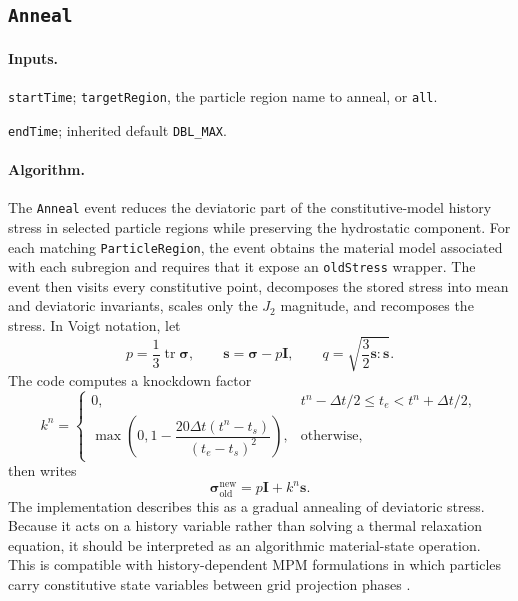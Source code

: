 \subsection{\texttt{Anneal}}
\label{subsec:event-anneal}

\paragraph{Inputs.}
\begin{description}[leftmargin=*,style=nextline]
\item[\textbf{Required.}] \texttt{startTime}; \texttt{targetRegion}, the particle region name to anneal, or \texttt{all}.
\item[\textbf{Optional.}] \texttt{endTime}; inherited default \texttt{DBL\_MAX}.
\end{description}

\paragraph{Algorithm.}
The \texttt{Anneal} event reduces the deviatoric part of the constitutive-model history stress in selected particle regions while preserving the hydrostatic component.  For each matching \texttt{ParticleRegion}, the event obtains the material model associated with each subregion and requires that it expose an \texttt{oldStress} wrapper.  The event then visits every constitutive point, decomposes the stored stress into mean and deviatoric invariants, scales only the $J_2$ magnitude, and recomposes the stress.  In Voigt notation, let
\begin{equation}
  p = \frac{1}{3}\operatorname{tr}\boldsymbol{\sigma},\qquad
  \mathbf{s}=\boldsymbol{\sigma}-p\mathbf{I},\qquad
  q=\sqrt{\frac{3}{2}\mathbf{s}:\mathbf{s}}.
\end{equation}
The code computes a knockdown factor
\begin{equation}
  k^n =
  \begin{cases}
  0, & t^n-\Delta t/2\le t_e < t^n+\Delta t/2,\\
  \max\left(0,1-\dfrac{20\Delta t(t^n-t_s)}{(t_e-t_s)^2}\right), & \text{otherwise},
  \end{cases}
  \label{eq:anneal-knockdown}
\end{equation}
then writes
\begin{equation}
  \boldsymbol{\sigma}_{\mathrm{old}}^{\mathrm{new}}
  = p\mathbf{I}+k^n\mathbf{s}.
  \label{eq:anneal-stress-update}
\end{equation}
The implementation describes this as a gradual annealing of deviatoric stress.  Because it acts on a history variable rather than solving a thermal relaxation equation, it should be interpreted as an algorithmic material-state operation.  This is compatible with history-dependent MPM formulations in which particles carry constitutive state variables between grid projection phases \cite{sulsky1994history,sulsky1995solid}.

